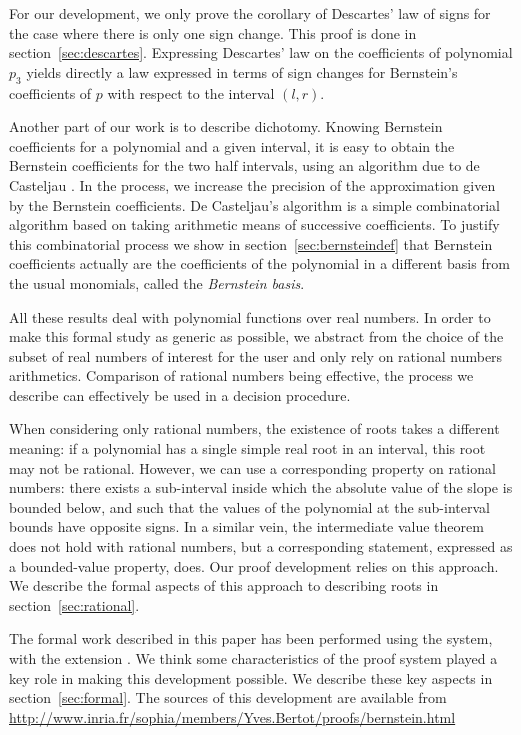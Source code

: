 \documentclass{mscs}
\begin{document}
For our development, we only prove the corollary  of
Descartes' law of signs for the case where there is only one sign
change.    This proof is done in section~\ref{sec:descartes}.
  Expressing Descartes' law on the coefficients of polynomial
\(p_3\) yields directly a law expressed in terms of sign changes for
Bernstein's coefficients of \(p\) with respect to the
interval
\((l,r)\).

Another part of our work is to describe dichotomy.  Knowing Bernstein
coefficients for a polynomial and a given interval, it is easy to
obtain the Bernstein coefficients for the two half intervals, using
an algorithm due to de Casteljau \cite{castel}.  In the process, we increase
the precision of the approximation given by the Bernstein
coefficients.  De Casteljau's algorithm is a simple combinatorial
algorithm based on taking arithmetic means of successive coefficients.
To justify this combinatorial process we show in
section~\ref{sec:bernsteindef} that Bernstein
coefficients actually are the coefficients of the polynomial in a
different basis from the usual monomials, called the {\em Bernstein basis}.

All these results deal with polynomial functions over real numbers. In
order to make this formal study as generic as possible, we abstract
from the choice of the subset of real numbers of interest for the
user and only rely on rational numbers arithmetics. Comparison of
rational numbers being effective, the process we describe can
effectively be used in a decision procedure.

When considering only rational numbers, the existence of roots takes a
different meaning: if a polynomial has a single simple real root in an
interval, this root may not be rational.  However, we can use a
corresponding property on rational numbers: there exists a
sub-interval inside which the absolute value of the slope is bounded
below, and such that the values of the polynomial at the sub-interval
bounds have opposite signs.  In a similar vein, the intermediate value
theorem  does not hold with rational numbers, but a corresponding
statement, expressed as a bounded-value property, does.  Our proof
development relies on this approach.  We describe the formal aspects
of this approach to describing roots in section~\ref{sec:rational}.

The formal work described in this paper has been performed using
the \Coq{} system\cite{coqart, coqsite}, with the \ssr{} extension
\cite{GONTHIER:2008:INRIA-00258384:4}.  We think some characteristics
of the proof system played a key role in making this development
possible.  We describe these key aspects in section~\ref{sec:formal}.
The sources of this development are available from\\
{\url{http://www.inria.fr/sophia/members/Yves.Bertot/proofs/bernstein.html}}
\end{document}
